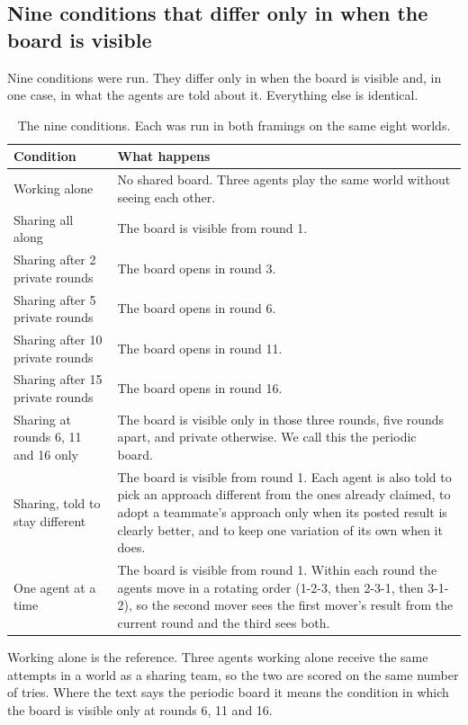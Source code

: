 \subsection{Nine conditions that differ only in when the board is visible}\label{sec:conditions}

Nine conditions were run. They differ only in when the board is visible and, in one case, in what the agents
are told about it. Everything else is identical.

\begin{table}[H]
  \centering
  \caption{The nine conditions. Each was run in both framings on the same eight worlds.}
  \label{tab:conditions}
  \small
  \renewcommand{\arraystretch}{1.35}
  \begin{tabular}{p{4.6cm} p{10.2cm}}
    \toprule
    Condition & What happens \\
    \midrule
    Working alone & No shared board. Three agents play the same world without seeing each other. \\
    Sharing all along & The board is visible from round 1. \\
    Sharing after 2 private rounds & The board opens in round 3. \\
    Sharing after 5 private rounds & The board opens in round 6. \\
    Sharing after 10 private rounds & The board opens in round 11. \\
    Sharing after 15 private rounds & The board opens in round 16. \\
    Sharing at rounds 6, 11 and 16 only & The board is visible only in those three rounds, five rounds apart, and private otherwise. We call this the periodic board. \\
    Sharing, told to stay different & The board is visible from round 1. Each agent is also told to pick an approach different from the ones already claimed, to adopt a teammate's approach only when its posted result is clearly better, and to keep one variation of its own when it does. \\
    One agent at a time & The board is visible from round 1. Within each round the agents move in a rotating order (1-2-3, then 2-3-1, then 3-1-2), so the second mover sees the first mover's result from the current round and the third sees both. \\
    \bottomrule
  \end{tabular}
\end{table}

Working alone is the reference. Three agents working alone receive the same \NAttempts{} attempts in a world
as a sharing team, so the two are scored on the same number of tries. Where the text says the periodic board it
means the condition in which the board is visible only at rounds 6, 11 and 16.


